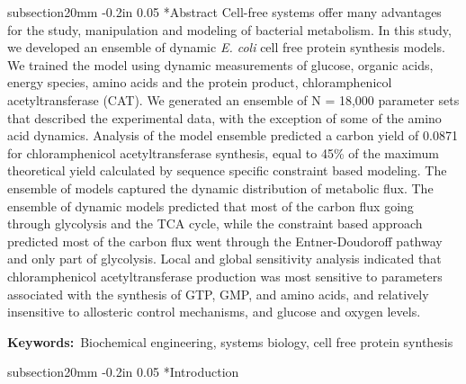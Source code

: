 \documentclass[12pt]{article}
\makeatletter
\renewcommand\section{\@startsection
	{subsection}{2}{0mm}
	{-0.2in}
	{0.05\baselineskip}
	{\normalfont\large\bfseries}}
\makeatother
\begin{document}
\section*{Abstract}
Cell-free systems offer many advantages for the study, manipulation and modeling of bacterial metabolism.
In this study, we developed an ensemble of dynamic \textit{E. coli} cell free protein synthesis models.
We trained the model using dynamic measurements of glucose, organic acids, energy species, amino acids and the protein product, chloramphenicol acetyltransferase (CAT).
We generated an ensemble of N = 18,000 parameter sets that described the experimental data, with the exception of some of the amino acid dynamics.
Analysis of the model ensemble predicted a carbon yield of 0.0871 for chloramphenicol acetyltransferase synthesis,
equal to 45\% of the maximum theoretical yield calculated by sequence specific constraint based modeling.
The ensemble of models captured the dynamic distribution of metabolic flux.
The ensemble of dynamic models predicted that most of the carbon flux going through glycolysis and the TCA cycle,
while the constraint based approach predicted most of the carbon flux went through the Entner-Doudoroff pathway and only part of glycolysis.
Local and global sensitivity analysis indicated that chloramphenicol acetyltransferase production was most sensitive to parameters associated with the synthesis of GTP, GMP, and amino acids, and relatively insensitive to allosteric control mechanisms, and glucose and oxygen levels.

\vspace{0.1in}
{\noindent \textbf{Keywords:}~Biochemical engineering, systems biology, cell free protein synthesis}

\pagebreak

\setcounter{page}{1}


\linenumbers


\section*{Introduction}
\end{document}
